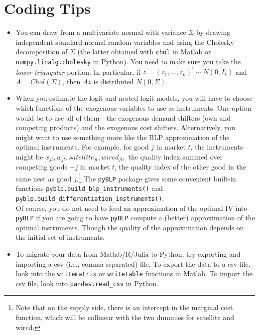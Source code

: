 \documentclass[english,11pt]{article}
\begin{document}
\section{Coding Tips}
\begin{itemize}
 
 \item You can draw from a multivariate normal with variance $\Sigma $ by
drawing independent standard normal random variables and using the Cholesky
decomposition of $\Sigma $ (the latter obtained with \texttt{chol} in Matlab or \texttt{numpy.linalg.cholesky} in Python). You need to make sure you take the \textit{lower triangular} portion.
In particular, if $z=(z_{1},\ldots ,z_{k})^{\prime }\sim N(0,I_{k})$ and $%
A=Chol(\Sigma )$, then $Az$ is distributed $N(0,\Sigma )$.


\item When you estimate the logit and nested logit models, you will have to choose which functions of the exogenous variables to use as instruments.  One option would be to use all of them---the exogenous demand shifters (own and competing products) and the exogenous cost shifters. Alternatively, you might want to use something more like the BLP approximation of the optimal instruments. For example,  for good $j$ in market $t$, the instruments might be $x_{jt}, w_{jt}, satellite_{jt}, wired_{jt},$ the quality index summed over competing goods $-j$ in market $t$, the quality index of the other good in the same nest as good $j$.\footnote{ Note that on the supply side, there is an intercept in the marginal cost function, which will be collinear with the two dummies for satellite and wired.} The \texttt{pyBLP} package gives some convenient built-in functions \texttt{pyblp.build\_blp\_instruments()} and \texttt{pyblp.build\_differentiation\_instruments()}.\\


Of course, you do not need to feed an approximation of the optimal IV into \texttt{pyBLP} if you are going to have \texttt{pyBLP} compute a (better) approximation of the optimal instruments. Though the quality of the approximation depends on the initial set of instruments.


\item To migrate your data from
Matlab/R/Julia  to Python, try exporting and importing a csv (i.e., comma separated)
file.  To export the  data to a csv file, look into the \texttt{writematrix}
or \texttt{writetable} functions in Matlab. To import the csv file, look
into \texttt{pandas.read\_csv} in Python.



\end{itemize}
\end{document}
